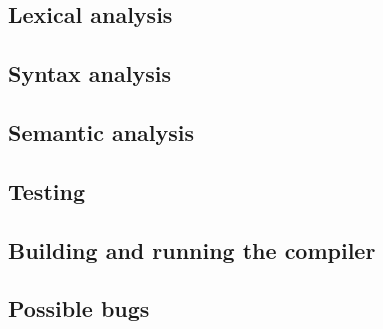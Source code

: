 \documentclass[a4paper,11pt]{article}
\begin{document}
\subsection{Lexical analysis}


\subsection{Syntax analysis}


\subsection{Semantic analysis}


\subsection{Testing}

\subsection{Building and running the compiler}

\subsection{Possible bugs}
\end{document}
